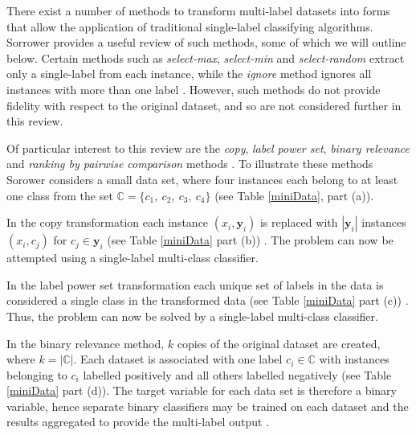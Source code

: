 \documentclass[Dissertation.tex]{subfiles}
\begin{document}
There exist a number of methods to transform multi-label datasets into forms that allow the application of traditional single-label classifying algorithms. Sorrower \cite{sorowerLiteratureSurveyAlgorithms2018} provides a useful review of such methods, some of which we will outline below. Certain methods such as \textit{select-max}, \textit{select-min} and \textit{select-random} extract only a single-label from each instance, while the \textit{ignore} method ignores all instances with more than one label \cite{sorowerLiteratureSurveyAlgorithms2018}. However, such methods do not provide fidelity with respect to the original dataset, and so are not considered further in this review. 

Of particular interest to this review are the \textit{copy}, \textit{label power set}, \textit{binary relevance} and \textit{ranking by pairwise comparison} methods \cite{sorowerLiteratureSurveyAlgorithms2018}. To illustrate these methods Sorower \cite{sorowerLiteratureSurveyAlgorithms2018} considers a small data set, where four instances each belong to at least one class from the set $\mathbb{C} = \{c_1, \ c_2, \ c_3, \ c_4\}$ (see Table \ref{miniData}, part (a)).

 In the copy transformation each instance $ (x_i, \mathbf{y}_i) $ is replaced with $ |\mathbf{y}_i| $ instances $ (x_i, c_j) $ for $ c_j \in \mathbf{y}_i $ (see Table \ref{miniData} part (b)) \cite{sorowerLiteratureSurveyAlgorithms2018}. The problem can now be attempted using a single-label multi-class classifier.

In the label power set transformation each unique set of labels in the data is considered a single class in the transformed data (see Table \ref{miniData} part (c)) \cite{sorowerLiteratureSurveyAlgorithms2018}. Thus, the problem can now be solved by a single-label multi-class classifier.

In the binary relevance method, $ k $ copies of the original dataset are created, where $ k = |\mathbb{C}| $. Each dataset is associated with one label $c_i \in \mathbb{C}$ with instances belonging to $ c_i $ labelled positively and all others labelled negatively (see Table \ref{miniData} part (d)). The target variable for each data set is therefore a binary variable, hence separate binary classifiers may be trained on each dataset and the results aggregated to provide the multi-label output \cite{sorowerLiteratureSurveyAlgorithms2018}.
\end{document}
